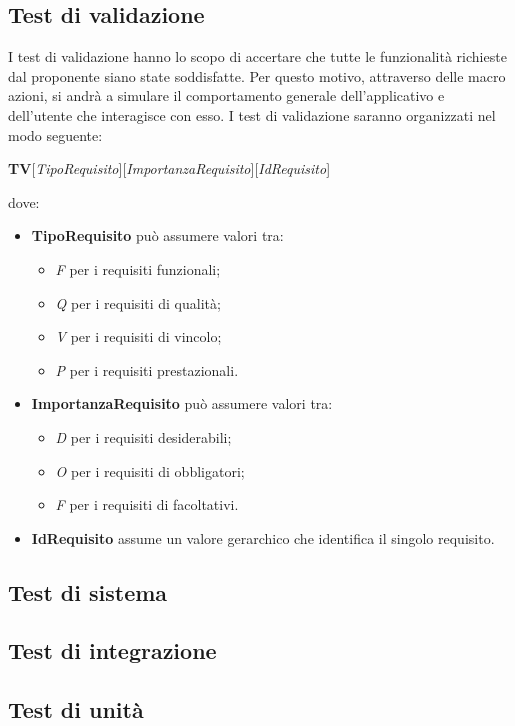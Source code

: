 \subsection{Test di validazione}
I test di validazione hanno lo scopo di accertare che tutte le funzionalità richieste dal proponente siano state soddisfatte. Per questo motivo, attraverso delle macro azioni, si andrà a simulare il comportamento generale dell'applicativo e dell'utente che interagisce con esso.
I test di validazione saranno organizzati nel modo seguente:
\begin{center}
\textbf{TV}[\textit{TipoRequisito}][\textit{ImportanzaRequisito}][\textit{IdRequisito}]
\end{center}
dove:
\begin{itemize}
\item
\textbf{TipoRequisito} può assumere valori tra:
	\begin{itemize}
	\item
	\textit{F} per i requisiti funzionali;
	\item
	\textit{Q} per i requisiti di qualità;
	\item
	\textit{V} per i requisiti di vincolo;
	\item
	\textit{P} per i requisiti prestazionali.
	\end{itemize}
\item 
\textbf{ImportanzaRequisito} può assumere valori tra:
	\begin{itemize}
	\item
	\textit{D} per i requisiti desiderabili;
	\item
	\textit{O} per i requisiti di obbligatori;
	\item
	\textit{F} per i requisiti di facoltativi.
	\end{itemize}
\item
\textbf{IdRequisito} assume un valore gerarchico che identifica il singolo requisito.
\end{itemize}
\subsection{Test di sistema}
\subsection{Test di integrazione}
\subsection{Test di unità}

%
%